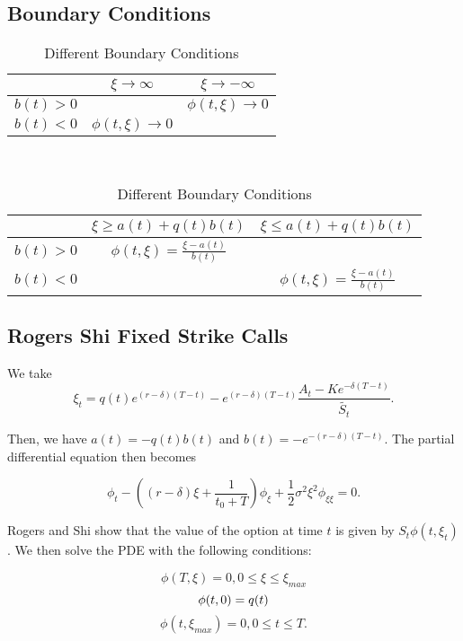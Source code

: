 \documentclass{article}
\begin{document}
\subsection{Boundary Conditions}
\begin{table}[h]
  \begin{tabular}{|c|c|c|}
    \hline
    & \(\xi \rightarrow \infty\) & \(\xi \rightarrow -\infty\) \\
    \hline
    \(b(t) > 0\) &  & \(\phi(t, \xi) \rightarrow 0\) \\
    \(b(t) < 0\) & \(\phi(t, \xi) \rightarrow 0\) & \\
    \hline
  \end{tabular}\\
  \begin{tabular}{|c|c|c|}
    \hline
    & \(\xi \ge a(t) + q(t)b(t)\) & \(\xi \le a(t) + q(t)b(t)\) \\
    \hline
    \(b(t) > 0\) & \(\phi(t, \xi) = \frac{\xi-a(t)}{b(t)} \) & \\
    \(b(t) < 0\) &  & \( \phi(t, \xi) = \frac{\xi-a(t)}{b(t)} \) \\
    \hline
  \end{tabular}
  \caption{Different Boundary Conditions}
\end{table}

\subsection{Rogers Shi Fixed Strike Calls}
We take
\begin{equation}
  \xi_t = q(t)e^{(r-\delta)(T-t)} - e^{(r-\delta)(T-t)}\frac{A_t - Ke^{-\delta(T-t)}}{\tilde{S_t}}.
\end{equation}

Then, we have \( a(t) = -q(t)b(t) \) and \(b(t) = -e^{-(r-\delta)(T-t)}\). The partial differential equation then becomes

\begin{equation}
  \phi_t - ( (r-\delta)\xi + \frac{1}{t_0 + T} ) \phi_\xi + \frac{1}{2}\sigma^2\xi^2\phi_{\xi\xi} = 0.
\end{equation}

Rogers and Shi show that the value of the option at time \(t\) is given by \(S_t\phi(t, \xi_t)\). We then solve the PDE with the following conditions:

\begin{equation}
  \phi(T, \xi) = 0, 0 \le \xi \le \xi_{max}
\end{equation}
\begin{equation}
  \phi(t, 0) = q(t) \\
\end{equation}
\begin{equation}
  \phi(t, \xi_{max}) = 0, 0 \le t \le T.
\end{equation}
\end{document}
